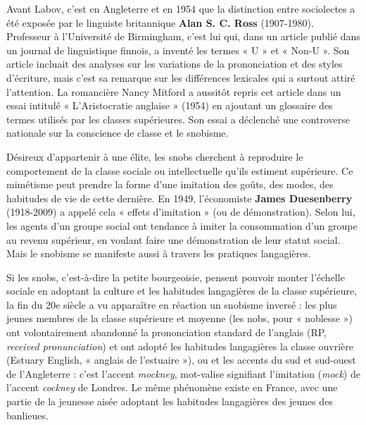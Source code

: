 Avant Labov, c’est en Angleterre et en 1954 que la distinction entre sociolectes a été exposée par le linguiste britannique \textbf{Alan S. C. Ross} (1907-1980). Professeur à l’Université de Birmingham, c’est lui qui, dans un article publié dans un journal de linguistique finnois, a inventé les termes
« U » et « Non-U ». Son article incluait des analyses sur les variations de la prononciation et des styles d’écriture, mais c’est sa remarque sur les différences lexicales qui a surtout attiré l’attention. La romancière Nancy Mitford a aussitôt repris cet article dans un essai intitulé « L’Aristocratie anglaise » (1954) en ajoutant un glossaire des termes utilisés par les classes supérieures. Son essai a déclenché une controverse nationale sur la conscience de classe et le snobisme.

Désireux d’appartenir à une élite, les snobs cherchent à reproduire le comportement de la classe sociale ou intellectuelle qu’ils estiment supérieure. Ce mimétisme peut prendre la forme d’une imitation des goûts, des modes, des habitudes de vie de cette dernière. En 1949, l’économiste \textbf{James Duesenberry} (1918-2009) a appelé cela « effets d’imitation » (ou de démonstration). Selon lui, les agents d’un groupe social ont tendance à imiter la consommation d’un groupe au revenu supérieur, en voulant faire une démonstration de leur statut social. Mais le snobisme se manifeste aussi à travers les pratiques langagières.

Si les snobs, c’est-à-dire la petite bourgeoisie, pensent pouvoir monter l’échelle sociale en adoptant la culture et les habitudes langagières de la classe supérieure, la fin du 20e siècle a vu apparaître en réaction un snobisme inversé : les plus jeunes membres de la classe supérieure et moyenne (les nobs, pour « noblesse ») ont volontairement abandonné la prononciation standard de l’anglais (RP, \textit{received pronunciation}) et ont adopté les habitudes langagières la classe ouvrière (Estuary English, « anglais de l’estuaire »), ou et les accents du sud et sud-ouest de l’Angleterre : c’est l’accent \textit{mockney}, mot-valise signifiant l’imitation (\textit{mock}) de l’accent \textit{cockney} de Londres. Le même phénomène existe en France, avec une partie de la jeunesse aisée adoptant les habitudes langagières des jeunes des banlieues.

